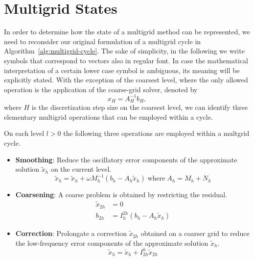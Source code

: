 \section{Multigrid States}
\label{sec:multigrid-states}
In order to determine how the state of a multigrid method can be represented, we need to reconsider our original formulation of a multigrid cycle in Algorithm~\ref{alg:multigrid-cycle}.
The sake of simplicity, in the following we write symbols that correspond to vectors also in regular font.
In case the mathematical interpretation of a certain lower case symbol is ambiguous, its meaning will be explicitly stated. 
With the exception of the coarsest level, where the only allowed operation is the application of the coarse-grid solver, denoted by
\begin{equation*}
	x_{H} = A^{-1}_H b_H,
\end{equation*}
where $H$ is the discretization step size on the coarsest level, we can identify three elementary multigrid operations that can be employed within a cycle.
\begin{definition}
\label{def:elementary-multigrid-operations}
On each level $l > 0$ the following three operations are employed within a multgrid cycle.
\begin{itemize}
	\item \textbf{Smoothing}: Reduce the oscillatory error components of the approximate solution $\tilde{x}_h$ on the current level. 
	\begin{equation*}
		\tilde{x}_h = \tilde{x}_h + \omega M_h^{-1} \left( b_h - A_h \tilde{x}_h \right) \; \text{where} \; A_h = M_h + N_h
	\end{equation*}
	\item \textbf{Coarsening}: A coarse problem is obtained by restricting the residual.
	\begin{align*}
		\tilde{x}_{2h} & = 0 \\
		b_{2h} & = I_h^{2h} (b_h - A_h \tilde{x}_h)
	\end{align*}
	\item \textbf{Correction}: Prolongate a correction $\tilde{x}_{2h}$ obtained on a coarser grid to reduce the low-frequency error components of the approximate solution $\tilde{x}_h$.
	\begin{equation*}
		\tilde{x}_h = \tilde{x}_h + I_{2h}^h \tilde{x}_{2h}
	\end{equation*}
\end{itemize}
\end{definition}
